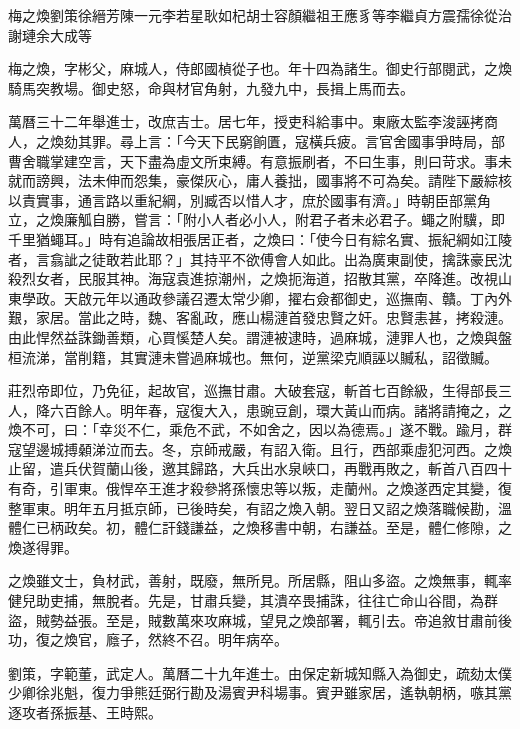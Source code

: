 
\begin{pinyinscope}
梅之煥劉策徐縉芳陳一元李若星耿如杞胡士容顏繼祖王應豸等李繼貞方震孺徐從治謝璉余大成等

梅之煥，字彬父，麻城人，侍郎國楨從子也。年十四為諸生。御史行部閱武，之煥騎馬突教場。御史怒，命與材官角射，九發九中，長揖上馬而去。

萬曆三十二年舉進士，改庶吉士。居七年，授吏科給事中。東廠太監李浚誣拷商人，之煥劾其罪。尋上言：「今天下民窮餉匱，寇橫兵疲。言官舍國事爭時局，部曹舍職掌建空言，天下盡為虛文所束縛。有意振刷者，不曰生事，則曰苛求。事未就而謗興，法未伸而怨集，豪傑灰心，庸人養拙，國事將不可為矣。請陛下嚴綜核以責實事，通言路以重紀綱，別臧否以惜人才，庶於國事有濟。」時朝臣部黨角立，之煥廉觚自勝，嘗言：「附小人者必小人，附君子者未必君子。蠅之附驥，即千里猶蠅耳。」時有追論故相張居正者，之煥曰：「使今日有綜名實、振紀綱如江陵者，言翕訿之徒敢若此耶？」其持平不欲傅會人如此。出為廣東副使，擒誅豪民沈殺烈女者，民服其神。海寇袁進掠潮州，之煥扼海道，招散其黨，卒降進。改視山東學政。天啟元年以通政參議召遷太常少卿，擢右僉都御史，巡撫南、贛。丁內外艱，家居。當此之時，魏、客亂政，應山楊漣首發忠賢之奸。忠賢恚甚，拷殺漣。由此悍然益誅鋤善類，心買慀楚人矣。謂漣被逮時，過麻城，漣罪人也，之煥與盤桓流涕，當削籍，其實漣未嘗過麻城也。無何，逆黨梁克順誣以贓私，詔徵贓。

莊烈帝即位，乃免征，起故官，巡撫甘肅。大破套寇，斬首七百餘級，生得部長三人，降六百餘人。明年春，寇復大入，患豌豆創，環大黃山而病。諸將請掩之，之煥不可，曰：「幸災不仁，乘危不武，不如舍之，因以為德焉。」遂不戰。踰月，群寇望邊城搏顙涕泣而去。冬，京師戒嚴，有詔入衛。且行，西部乘虛犯河西。之煥止留，遣兵伏賀蘭山後，邀其歸路，大兵出水泉峽口，再戰再敗之，斬首八百四十有奇，引軍東。俄悍卒王進才殺參將孫懷忠等以叛，走蘭州。之煥遂西定其變，復整軍東。明年五月抵京師，已後時矣，有詔之煥入朝。翌日又詔之煥落職候勘，溫體仁已柄政矣。初，體仁訐錢謙益，之煥移書中朝，右謙益。至是，體仁修隙，之煥遂得罪。

之煥雖文士，負材武，善射，既廢，無所見。所居縣，阻山多盜。之煥無事，輒率健兒助吏捕，無脫者。先是，甘肅兵變，其潰卒畏捕誅，往往亡命山谷間，為群盜，賊勢益張。至是，賊數萬來攻麻城，望見之煥部署，輒引去。帝追敘甘肅前後功，復之煥官，廕子，然終不召。明年病卒。

劉策，字範董，武定人。萬曆二十九年進士。由保定新城知縣入為御史，疏劾太僕少卿徐兆魁，復力爭熊廷弼行勘及湯賓尹科場事。賓尹雖家居，遙執朝柄，嗾其黨逐攻者孫振基、王時熙。


\end{pinyinscope}

